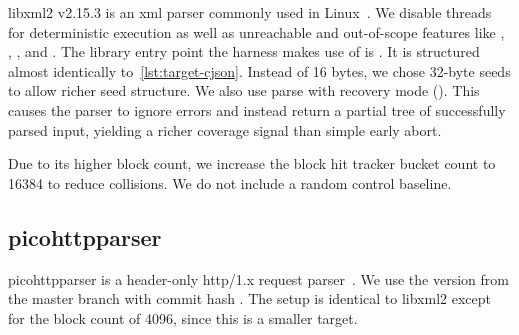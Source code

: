 libxml2 v2.15.3 is an \gls{xml} parser commonly used in Linux~\cite{veillard_libxml2_nodate}.
We disable threads for deterministic execution as well as unreachable and out-of-scope
features like , , ,  and .
The library entry point the harness makes use of is .
It is structured almost identically to~\cref{lst:target-cjson}.
Instead of 16 bytes, we chose 32-byte seeds to allow richer seed structure.
We also use parse with recovery mode ().
This causes the parser to ignore errors and instead return a partial tree of successfully parsed input,
yielding a richer coverage signal than simple early abort.

Due to its higher block count, we increase the block hit tracker bucket count
to \num{16384} to reduce collisions.
We do not include a random control baseline.

\subsection{picohttpparser}\label{sec:target-picohttpparser}

picohttpparser is a header-only \gls{http}/1.x request parser~\cite{oku_picohttpparser_nodate}.
We use the version from the master branch with commit hash .
The setup is identical to libxml2 except for the block count of \num{4096}, since this is a smaller target.
